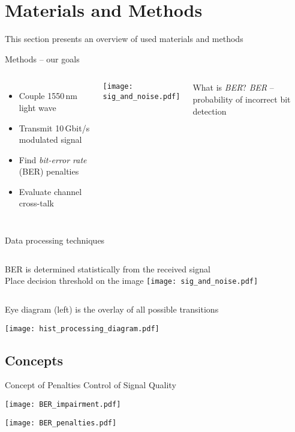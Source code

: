 \section{Materials and Methods}
  This section presents an overview of used materials and methods
  \begin{frame}{Methods -- our goals}
    \begin{columns}
        \begin{itemize}
          \item Couple 1550\,nm light wave
          \item Transmit 10\,Gbit/s modulated signal
          \item Find \emph{bit-error rate} (BER) penalties
          \item Evaluate channel cross-talk
        \end{itemize}
        \texttt{[image: sig\_and\_noise.pdf]}
    \pause
    \begin{exampleblock}{What is \emph{BER}?}
      \emph{BER} -- probability of incorrect bit detection\\
    \end{exampleblock}
    \end{columns}

  \end{frame}

  
  \begin{frame}{Data processing techniques}
    \begin{columns}
        BER is determined statistically from the received signal\\
        \alert{Place decision threshold on the image}
        \texttt{[image: sig\_and\_noise.pdf]}
    \end{columns}
    Eye diagram (left) is the overlay of all possible transitions
    \begin{center}
      \texttt{[image: hist\_processing\_diagram.pdf]}
    \end{center}
  \end{frame}

  
  \subsection{Concepts} %
  \label{sub:concepts}
  \begin{frame}{Concept of Penalties}
               {Control of Signal Quality}
    \begin{center}
     \texttt{[image: BER\_impairment.pdf]}
    \end{center}
    \begin{center}
     \texttt{[image: BER\_penalties.pdf]}
    \end{center}
  \end{frame}




